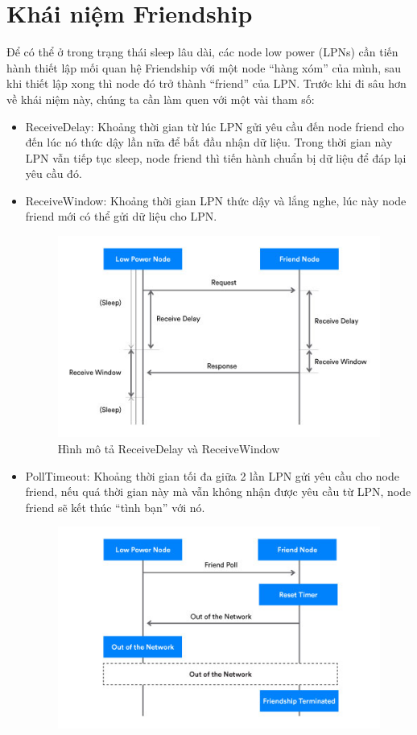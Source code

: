         \section{Khái niệm Friendship}
       Để có thể ở trong trạng thái sleep lâu dài, các node low power (LPNs) cần tiến hành thiết lập mối quan hệ Friendship với một node ``hàng xóm'' của mình, sau khi thiết lập xong thì node đó trở thành ``friend'' của LPN. Trước khi đi sâu hơn về khái niệm này, chúng ta cần làm quen với một vài tham số:
       \begin{itemize}
	\item ReceiveDelay: Khoảng thời gian từ lúc LPN gửi yêu cầu đến node friend cho đến lúc nó thức dậy lần nữa để bắt đầu nhận dữ liệu. Trong thời gian này LPN vẫn tiếp tục sleep, node friend thì tiến hành chuẩn bị dữ liệu để đáp lại yêu cầu đó.
	\item ReceiveWindow: Khoảng thời gian LPN thức dậy và lắng nghe, lúc này node friend mới có thể gửi dữ liệu cho LPN.
	\newpage
	\begin{figure}[h!]
        	\begin{center}
        		\includegraphics[scale=0.6]{images/friendship-1.jpg}
        		\caption{Hình mô tả ReceiveDelay và ReceiveWindow}
        	\end{center}
        	\end{figure}
        	\item PollTimeout: Khoảng thời gian tối đa giữa 2 lần LPN gửi yêu cầu cho node friend, nếu quá thời gian này mà vẫn không nhận được yêu cầu từ LPN, node friend sẽ kết thúc ``tình bạn'' với nó.
        	\begin{figure}[h!]
        	\begin{center}
        		\includegraphics[scale=0.6]{images/friendship-2.jpg}

\end{center}
\end{figure}
\end{itemize}
